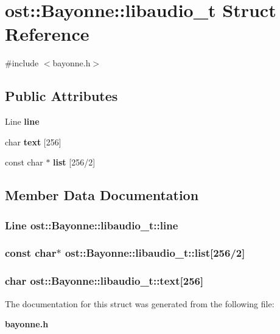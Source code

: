 \section{ost::Bayonne::libaudio\_\-t Struct Reference}
\label{structost_1_1_bayonne_1_1libaudio__t}


{\ttfamily \#include $<$bayonne.h$>$}\subsection*{Public Attributes}
\begin{DoxyCompactItemize}
\item 
Line {\bf line}
\item 
char {\bf text} [256]
\item 
const char $\ast$ {\bf list} [256/2]
\end{DoxyCompactItemize}


\subsection{Member Data Documentation}
\subsubsection[{line}]{\setlength{\rightskip}{0pt plus 5cm}Line {\bf ost::Bayonne::libaudio\_\-t::line}}\label{structost_1_1_bayonne_1_1libaudio__t_ae41ce29efa1d4eeb03c835d0046d21a0}
\subsubsection[{list}]{\setlength{\rightskip}{0pt plus 5cm}const char$\ast$ {\bf ost::Bayonne::libaudio\_\-t::list}[256/2]}\label{structost_1_1_bayonne_1_1libaudio__t_acfacdef8970f8623ae6e270a3ffde6f0}
\subsubsection[{text}]{\setlength{\rightskip}{0pt plus 5cm}char {\bf ost::Bayonne::libaudio\_\-t::text}[256]}\label{structost_1_1_bayonne_1_1libaudio__t_a2c40a528f1f716a5a227f45ec297b48f}


The documentation for this struct was generated from the following file:\begin{DoxyCompactItemize}
\item 
{\bf bayonne.h}\end{DoxyCompactItemize}
